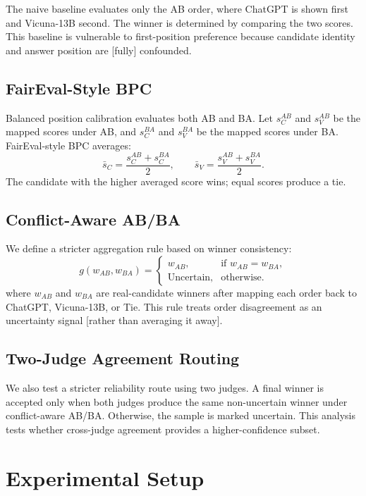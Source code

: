 \documentclass[11pt]{article}
\begin{document}
The naive baseline evaluates only the AB order, where ChatGPT is shown first and Vicuna-13B second. The winner is determined by comparing the two scores. This baseline is vulnerable to first-position preference because candidate identity and answer position are [fully] confounded.

\subsection{FairEval-Style BPC}

Balanced position calibration evaluates both AB and BA. Let $s_C^{AB}$ and $s_V^{AB}$ be the mapped scores under AB, and $s_C^{BA}$ and $s_V^{BA}$ be the mapped scores under BA. FairEval-style BPC averages:
\[
\bar{s}_C = \frac{s_C^{AB} + s_C^{BA}}{2}, \qquad
\bar{s}_V = \frac{s_V^{AB} + s_V^{BA}}{2}.
\]
The candidate with the higher averaged score wins; equal scores produce a tie.

\subsection{Conflict-Aware AB/BA}

We define a stricter aggregation rule based on winner consistency:
\[
g(w_{AB}, w_{BA}) =
\begin{cases}
w_{AB}, & \text{if } w_{AB}=w_{BA},\\
\text{Uncertain}, & \text{otherwise.}
\end{cases}
\]
where $w_{AB}$ and $w_{BA}$ are real-candidate winners after mapping each order back to ChatGPT, Vicuna-13B, or Tie. This rule treats order disagreement as an uncertainty signal [rather than averaging it away].

\subsection{Two-Judge Agreement Routing}

We also test a stricter reliability route using two judges. A final winner is accepted only when both judges produce the same non-uncertain winner under conflict-aware AB/BA. Otherwise, the sample is marked uncertain. This analysis tests whether cross-judge agreement provides a higher-confidence subset.

\section{Experimental Setup}
\end{document}
